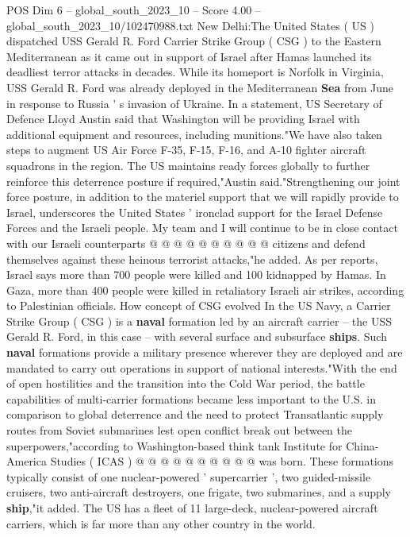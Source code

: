 \begin{textsample}{POS Dim 6 – global\_south\_2023\_10 – Score 4.00 – global\_south\_2023\_10/102470988.txt}  \label{ex:f6_pos_300}
New Delhi:The United States ( US ) dispatched USS Gerald R.
Ford Carrier Strike Group ( CSG ) to the Eastern Mediterranean as it came out in support of Israel after Hamas launched its deadliest terror attacks in decades.
While its homeport is Norfolk in Virginia, USS Gerald R.
Ford was already deployed in the Mediterranean \textbf{Sea} from June in response to Russia ' s invasion of Ukraine.
In a statement, US Secretary of Defence Lloyd Austin said that Washington will be providing Israel with additional equipment and resources, including munitions."We have also taken steps to augment US Air Force F-35, F-15, F-16, and A-10 fighter aircraft squadrons in the region.
The US maintains ready forces globally to further reinforce this deterrence posture if required,"Austin said."Strengthening our joint force posture, in addition to the materiel support that we will rapidly provide to Israel, underscores the United States ' ironclad support for the Israel Defense Forces and the Israeli people.
My team and I will continue to be in close contact with our Israeli counterparts @ @ @ @ @ @ @ @ @ @ citizens and defend themselves against these heinous terrorist attacks,"he added.
As per reports, Israel says more than 700 people were killed and 100 kidnapped by Hamas.
In Gaza, more than 400 people were killed in retaliatory Israeli air strikes, according to Palestinian officials.
How concept of CSG evolved In the US Navy, a Carrier Strike Group ( CSG ) is a \textbf{naval} formation led by an aircraft carrier -- the USS Gerald R.
Ford, in this case -- with several surface and subsurface \textbf{ships}.
Such \textbf{naval} formations provide a military presence wherever they are deployed and are mandated to carry out operations in support of national interests."With the end of open hostilities and the transition into the Cold War period, the battle capabilities of multi-carrier formations became less important to the U.S. in comparison to global deterrence and the need to protect Transatlantic supply routes from Soviet submarines lest open conflict break out between the superpowers,"according to Washington-based think tank Institute for China-America Studies ( ICAS ) @ @ @ @ @ @ @ @ @ @ was born.
These formations typically consist of one nuclear-powered ' supercarrier ', two guided-missile cruisers, two anti-aircraft destroyers, one frigate, two submarines, and a supply \textbf{ship},"it added.
The US has a fleet of 11 large-deck, nuclear-powered aircraft carriers, which is far more than any other country in the world.

\end{textsample}
